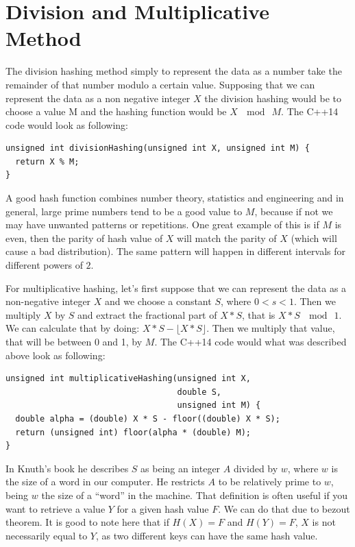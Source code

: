 \section{Division and Multiplicative Method}

The division hashing method simply to represent the data as a number take the remainder of that number modulo a certain value. Supposing that we can represent the data as a non negative integer \( X \) the division hashing would be to choose a value M and the hashing function would be \( X ~\mod~ M \). The C++14 code would look as following:

\begin{lstlisting}
unsigned int divisionHashing(unsigned int X, unsigned int M) {
  return X % M;
}
\end{lstlisting}

A good hash function combines number theory, statistics and engineering and in general, large prime numbers tend to be a good value to \( M \), because if not we may have unwanted patterns or repetitions. One great example of this is if \( M \) is even, then the parity of hash value of \( X \) will match the parity of \( X \) (which will cause a bad distribution). The same pattern will happen in different intervals for different powers of \( 2 \).

For multiplicative hashing, let's first suppose that we can represent the data as a non-negative integer \( X \) and we choose a constant \( S \), where \( 0 < s < 1 \). Then we multiply \( X \) by \( S \) and extract the fractional part of \( X * S \), that is \( X * S ~\mod ~ 1 \). We can calculate that by doing: \( X * S - \lfloor X * S \rfloor \). Then we multiply that value, that will be between 0 and 1, by \( M \). The C++14 code would what was described above look as following:

\medskip

\begin{lstlisting}
unsigned int multiplicativeHashing(unsigned int X,
                                   double S,
                                   unsigned int M) {
  double alpha = (double) X * S - floor((double) X * S);
  return (unsigned int) floor(alpha * (double) M);
}
\end{lstlisting}

In Knuth's book he describes \( S \) as being an integer \( A \) divided by \( w \), where \( w \) is the size of a word in our computer. He restricts \( A \) to be relatively prime to \( w \), being \( w \) the size of a ``word'' in the machine. That definition is often useful if you want to retrieve a value \( Y \) for a given hash value \( F \). We can do that due to bezout theorem. It is good to note here that if \( H(X) = F \) and \( H(Y) = F \), \( X \) is not necessarily equal to \( Y \), as two different keys can have the same hash value.


